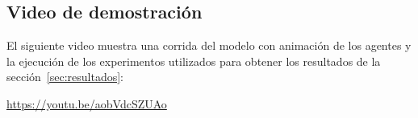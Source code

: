 \documentclass[a4paper, 11pt]{article}
\begin{document}
\subsection{Video de demostraci\'on}

El siguiente video muestra una corrida del modelo con animaci\'on de los agentes y
la ejecuci\'on de los experimentos utilizados para obtener los resultados de la
secci\'on~\ref{sec:resultados}:

\begin{center}
\url{https://youtu.be/aobVdcSZUAo}
\end{center}

\newpage
\nocite{anylogic2023}


\end{document}
